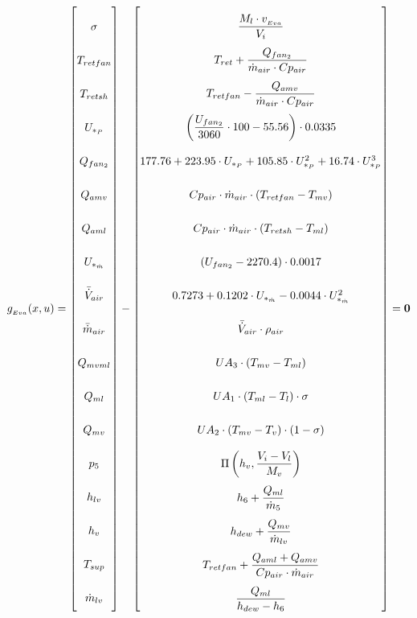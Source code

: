 \begin{equation} \label{eq:Gevaporator}\renewcommand{\arraystretch}{2.5}
	g_{_{Eva}}(x,u) =  \begin{bmatrix}
		\sigma		\\
		T_{retfan}	\\
		T_{retsh}	\\
		U_{*_P}	\\
		Q_{fan_2}		\\
		Q_{amv}		\\
		Q_{aml}		\\
		U_{*_{\dot{m}}}	\\
		\bar{\dot{V}}_{air}		\\
		\bar{\dot{m}}_{air}		\\
		Q_{mvml}	\\
		Q_{ml}		\\
		Q_{mv}		\\
		p_{5}		\\
		h_{lv}			\\
		h_v 		\\
		T_{sup}		\\
		\dot{m}_{lv}\\
	\end{bmatrix}
	-
	\begin{bmatrix}
		\dfrac{M_l \cdot v_{_{Eva}}}{V_i}							\\
		T_{ret} + \dfrac{Q_{fan_2}}{\dot{m}_{air} \cdot Cp_{air}}			\\
		T_{retfan} - \dfrac{Q_{amv}}{\dot{m}_{air} \cdot Cp_{air}}		\\
		\left( \dfrac{U_{fan_2}}{3060}\cdot 100 - 55.56 \right) \cdot 0.0335 \\
		177.76 + 223.95 \cdot U_{*_P} + 105.85 \cdot U_{*_P}^2 + 16.74 \cdot U_{*_P}^3 \\
		Cp_{air} \cdot \dot{m}_{air} \cdot (T_{retfan} - T_{mv}) 	 \\
		Cp_{air} \cdot \dot{m}_{air} \cdot (T_{retsh} - T_{ml}) \\
		(U_{fan_2} - 2270.4)\cdot 0.0017 \\
		0.7273 + 0.1202 \cdot 	U_{*_{\dot{m}}}  -0.0044 \cdot	U_{*_{\dot{m}}}^2\\
		\bar{\dot{V}}_{air} \cdot \rho_{air}	\\
		U A_3 \cdot (T_{mv} - T_{ml})	\\
		U A_1 \cdot (T_{ml} - T_l) \cdot \sigma	\\
		U A_2 \cdot (T_{mv} - T_v) \cdot (1- \sigma)	\\
		\Pi \left( h_v, \dfrac{V_i-V_l}{M_v} \right)		\\
		h_{6} + \dfrac{Q_{ml}}{\dot{m}_{5}}			\\
		h_{dew} + \dfrac{Q_{mv}}{\dot{m}_{lv}}   		\\
		T_{retfan} +  \dfrac{Q_{aml} + Q_{amv}}{Cp_{air} \cdot \dot{m}_{air}} \\
		\dfrac{Q_{ml}}{h_{dew} - h_{6}}		\\
	\end{bmatrix}
	=\textbf{0}
\end{equation}



